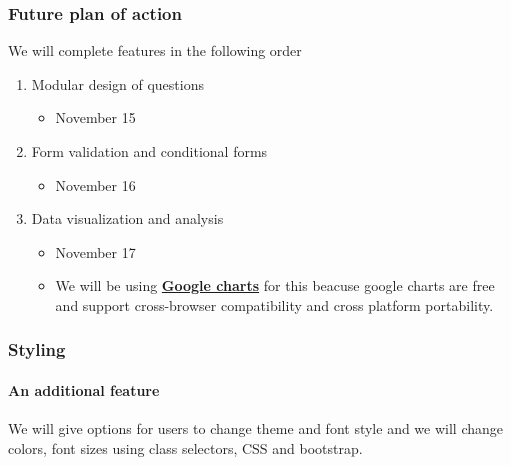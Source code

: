 \documentclass{beamer}
\begin{document}
\begin{frame}
	\frametitle{Future plan of action}
	We will complete features in the following order
	\begin{enumerate}
		\item Modular design of questions
		\begin{itemize}
			\item November 15
		\end{itemize}
	\item Form validation and conditional forms
	\begin{itemize}
		\item November 16
	\end{itemize}
\item Data visualization and analysis
\begin{itemize}
	\item November 17
	\item We will be using \href{https://developers.google.com/chart}{\textbf{Google charts}} for this beacuse google charts are free and support cross-browser compatibility and cross platform portability.
\end{itemize}
	\end{enumerate}
\end{frame}
\begin{frame}
	\frametitle{Styling}
	\framesubtitle{An additional feature}
	We will give options for users to change theme and font style and we will change colors, font sizes using class selectors, CSS and bootstrap.
\end{frame}
\end{document}
